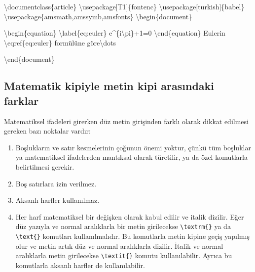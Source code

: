 \documentclass[
  letterpaper,
  DIV=11,
  numbers=noendperiod]{scrreprt}
\newenvironment{Shaded}{\begin{snugshade}}{\end{snugshade}}
\newcommand{\BuiltInTok}[1]{\textcolor[rgb]{0.00,0.23,0.31}{#1}}
\newcommand{\ExtensionTok}[1]{\textcolor[rgb]{0.00,0.23,0.31}{#1}}
\newcommand{\FunctionTok}[1]{\textcolor[rgb]{0.28,0.35,0.67}{#1}}
\newcommand{\KeywordTok}[1]{\textcolor[rgb]{0.00,0.23,0.31}{#1}}
\newcommand{\NormalTok}[1]{\textcolor[rgb]{0.00,0.23,0.31}{#1}}
\newcommand{\SpecialCharTok}[1]{\textcolor[rgb]{0.37,0.37,0.37}{#1}}
\newcommand{\SpecialStringTok}[1]{\textcolor[rgb]{0.13,0.47,0.30}{#1}}
\providecommand{\tightlist}{%
  \setlength{\itemsep}{0pt}\setlength{\parskip}{0pt}}\usepackage{longtable,booktabs,array}
\begin{document}
\begin{Shaded}
\begin{Highlighting}[]
\BuiltInTok{\textbackslash{}documentclass}\NormalTok{\{}\ExtensionTok{article}\NormalTok{\}}
\BuiltInTok{\textbackslash{}usepackage}\NormalTok{[T1]\{}\ExtensionTok{fontenc}\NormalTok{\}}
\BuiltInTok{\textbackslash{}usepackage}\NormalTok{[turkish]\{}\ExtensionTok{babel}\NormalTok{\}}
\BuiltInTok{\textbackslash{}usepackage}\NormalTok{\{}\ExtensionTok{amsmath,amssymb,amsfonts}\NormalTok{\}}
\KeywordTok{\textbackslash{}begin}\NormalTok{\{}\ExtensionTok{document}\NormalTok{\}}

\KeywordTok{\textbackslash{}begin}\NormalTok{\{}\ExtensionTok{equation}\NormalTok{\}}
\SpecialCharTok{\textbackslash{}label}\SpecialStringTok{\{eq:euler\}}
\SpecialStringTok{  e\^{}\{i}\SpecialCharTok{\textbackslash{}pi}\SpecialStringTok{\}+1=0}
\KeywordTok{\textbackslash{}end}\NormalTok{\{}\ExtensionTok{equation}\NormalTok{\}}
\NormalTok{Euler\textquotesingle{}in }\KeywordTok{\textbackslash{}eqref}\NormalTok{\{}\ExtensionTok{eq:euler}\NormalTok{\} formülüne göre}\FunctionTok{\textbackslash{}dots}

\KeywordTok{\textbackslash{}end}\NormalTok{\{}\ExtensionTok{document}\NormalTok{\}}
\end{Highlighting}
\end{Shaded}

\hypertarget{matematik-kipiyle-metin-kipi-arasux131ndaki-farklar}{%
\subsection{Matematik kipiyle metin kipi arasındaki
farklar}\label{matematik-kipiyle-metin-kipi-arasux131ndaki-farklar}}

Matematiksel ifadeleri girerken düz metin girişinden farklı olarak
dikkat edilmesi gereken bazı noktalar vardır:

\begin{enumerate}
\def\labelenumi{\arabic{enumi}.}
\tightlist
\item
  Boşlukların ve satır kesmelerinin çoğunun önemi yoktur, çünkü tüm
  boşluklar ya matematiksel ifadelerden mantıksal olarak türetilir, ya
  da özel komutlarla belirtilmesi gerekir.
\item
  Boş satırlara izin verilmez.
\item
  Aksanlı harfler kullanılmaz.
\item
  Her harf matematiksel bir değişken olarak kabul edilir ve italik
  dizilir. Eğer düz yazıyla ve normal aralıklarla bir metin girilecekse
  \texttt{\textbackslash{}textrm\{\}} ya da
  \texttt{\textbackslash{}text\{\}} komutları kullanılmalıdır. Bu
  komutlarla metin kipine geçiş yapılmış olur ve metin artık düz ve
  normal aralıklarla dizilir. İtalik ve normal aralıklarla metin
  girilecekse \texttt{\textbackslash{}textit\{\}} komutu kullanılabilir.
  Ayrıca bu komutlarla aksanlı harfler de kullanılabilir.
\end{enumerate}
\end{document}
